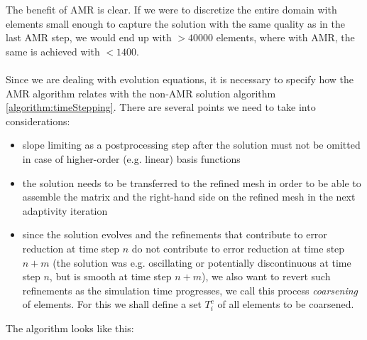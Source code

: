 The benefit of AMR is clear. If we were to discretize the entire domain with elements small enough to capture the solution with the same quality as in the last AMR step, we would end up with $> 40000$ elements, where with AMR, the same is achieved with $< 1400$.

\paragraph{}
Since we are dealing with evolution equations, it is necessary to specify how the AMR algorithm relates with the non-AMR solution algorithm \cref{algorithm:timeStepping}. There are several points we need to take into considerations:
\begin{itemize}
	\item slope limiting as a postprocessing step after the solution must not be omitted in case of higher-order (e.g. linear) basis functions
	\item the solution needs to be transferred to the refined mesh in order to be able to assemble the matrix and the right-hand side on the refined mesh in the next adaptivity iteration
	\item since the solution evolves and the refinements that contribute to error reduction at time step $n$ do not contribute to error reduction at time step $n + m$ (the solution was e.g. oscillating or potentially discontinuous at time step $n$, but is smooth at time step $n + m$), we also want to revert such refinements as the simulation time progresses, we call this process \textit{coarsening} of elements. For this we shall define a set $T^{c}_i$ of all elements to be coarsened.
\end{itemize}
The algorithm looks like this:

